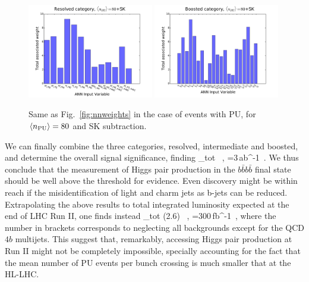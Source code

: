 \begin{figure}[t]
\begin{center}
\includegraphics[width=0.49\textwidth]{plots/res_wgthist_SKPU80.pdf}
\includegraphics[width=0.49\textwidth]{plots/bst_wgthist_SKPU80.pdf}
\vspace{-0.5cm}
\caption{\small
Same as Fig.~\ref{fig:nnweights} in the
case of events with PU, for
 $\left\langle n_{\rm PU}\right\rangle=80$ 
  and SK subtraction.
}
\label{fig:nnweights_PU}
\end{center}
\end{figure}

We can finally combine the three categories, resolved,
intermediate and boosted, and determine the overall signal
significance, finding
\be
\lp {}\rp_{\rm tot}  \, ,\quad
{}=3\,{\rm ab}^{-1}\, .
\ee
%
We thus conclude that the measurement of
Higgs pair production in the $b\bar{b}b\bar{b}$ final state
should be 
well above the threshold for evidence.
%
Even
discovery might be within reach if the
misidentification of light and charm jets as b-jets can be  reduced.
%
Extrapolating the above results
to total integrated luminosity expected at the end of
LHC Run II, one finds
instead
\be
\lp {}\rp_{\rm tot} (2.6) \, ,\quad
{}=300\,{\rm fb}^{-1}\, ,
\ee
where the number in brackets corresponds to neglecting all backgrounds
except for the QCD $4b$ multijets.
%
This suggest that, remarkably, accessing Higgs pair production at Run II
might not be completely impossible, specially accounting
for the fact that the mean number of PU events per
bunch crossing is much smaller
that at the HL-LHC.


